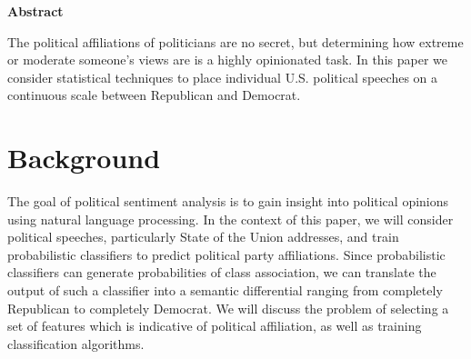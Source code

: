 \documentclass{amsart}
\newtheorem{thm}{Theorem}[section]
\theoremstyle{definition}
\theoremstyle{remark}
\numberwithin{equation}{section}
\begin{document}






\begin{center}\textbf{Abstract}\end{center}
The political affiliations of politicians are no secret, but determining how extreme or moderate someone's views are is a highly opinionated task. In this paper we consider statistical techniques to place individual U.S. political speeches on a continuous scale between Republican and Democrat.\\


\newpage

\tableofcontents

\newpage

\section{Background}
The goal of political sentiment analysis is to gain insight into political opinions using natural language processing. In the context of this paper, we will consider political speeches, particularly State of the Union addresses, and train probabilistic classifiers to predict political party affiliations. Since probabilistic classifiers can generate probabilities of class association, we can translate the output of such a classifier into a semantic differential ranging from completely Republican to completely Democrat. We will discuss the problem of selecting a set of features which is indicative of political affiliation, as well as training classification algorithms.\\
\end{document}
